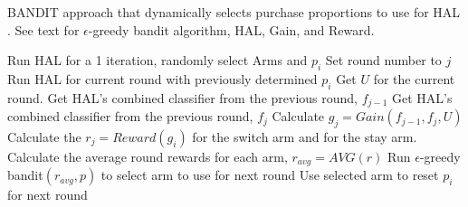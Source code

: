 \documentclass[ms]{nuthesis}
\begin{document}
\begin{algorithm}[!htb]
\small{
\caption{ BANDIT approach that dynamically selects purchase
proportions to use for HAL \cite{yugi}. See text for
$\epsilon$-greedy bandit algorithm, HAL, Gain, and Reward.
}
\label{alg:bandit}
\begin{algorithmic}
\State Run HAL for a 1 iteration, randomly select Arms and $p_i$
\State Set round number to $j$
\State Run HAL for current round with previously determined $p_i$
\State Get $U$ for the current round.
\State Get HAL's combined classifier from the previous round, $f_{j-1}$
\State Get HAL's combined classifier from the previous round, $f_{j}$
\State Calculate $g_j=Gain(f_{j-1}, f_{j}, U)$
\State Calculate the $r_j=Reward(g_i)$ for the switch arm and for the stay arm.
\State Calculate the average round rewards for each arm, $r_{avg} = AVG(r)$
\State Run $\epsilon$-greedy bandit$(r_{avg}, p)$ to select arm to use for next round
\State Use selected arm to reset $p_i$ for next round
\EndWhile
\EndFunction
\end{algorithmic}
}
\end{algorithm}
\end{document}
